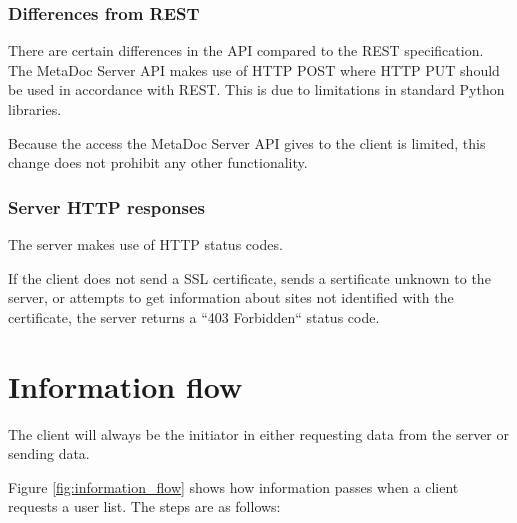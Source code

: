\documentclass[titlepage, a4paper,10pt]{article}
\begin{document}
\subsubsection{Differences from REST}

There are certain differences in the API compared to the REST specification. The 
MetaDoc Server API makes use of HTTP POST where HTTP PUT should be used in 
accordance with REST. This is due to limitations in standard Python libraries.

Because the access the MetaDoc Server API gives to the client is limited, this 
change does not prohibit any other functionality. 

\subsubsection{Server HTTP responses}

The server makes use of HTTP status codes.

If the client does not send a SSL certificate, sends a sertificate unknown to 
the server, or attempts to get information about sites not identified with the
certificate, the server returns a ``403 Forbidden`` status code.

\newpage
\section{Information flow}

The client will always be the initiator in either requesting data from the
server or sending data. 

Figure \ref{fig:information_flow} shows how information passes when a client
requests a user list. The steps are as follows:
\end{document}
